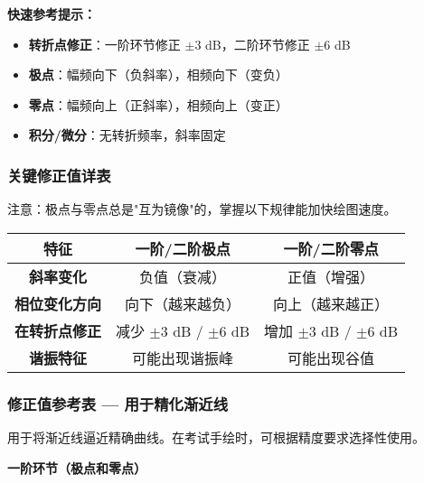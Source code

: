 \textbf{快速参考提示：}
\begin{itemize}
    \item \textbf{转折点修正}：一阶环节修正 $\pm 3$ dB，二阶环节修正 $\pm 6$ dB
    \item \textbf{极点}：幅频向下（负斜率），相频向下（变负）
    \item \textbf{零点}：幅频向上（正斜率），相频向上（变正）
    \item \textbf{积分/微分}：无转折频率，斜率固定
\end{itemize}

\subsubsection{关键修正值详表}

注意：极点与零点总是"互为镜像"的，掌握以下规律能加快绘图速度。

{\renewcommand{\arraystretch}{1.6}
\begin{center}
\small
\begin{tabular}{|c|c|c|}
\hline
\rowcolor{blue!20}
\textbf{特征} & \textbf{一阶/二阶极点} & \textbf{一阶/二阶零点} \\
\hline
\rowcolor{gray!5}
\textbf{斜率变化} & 负值（衰减） & 正值（增强） \\
\hline
\textbf{相位变化方向} & 向下（越来越负） & 向上（越来越正） \\
\hline
\rowcolor{gray!5}
\textbf{在转折点修正} & 减少 $\pm 3$ dB / $\pm 6$ dB & 增加 $\pm 3$ dB / $\pm 6$ dB \\
\hline
\textbf{谐振特征} & 可能出现谐振峰 & 可能出现谷值 \\
\hline
\end{tabular}
\end{center}
}

\subsubsection{修正值参考表 — 用于精化渐近线}

用于将渐近线逼近精确曲线。在考试手绘时，可根据精度要求选择性使用。

\textbf{一阶环节（极点和零点）}

